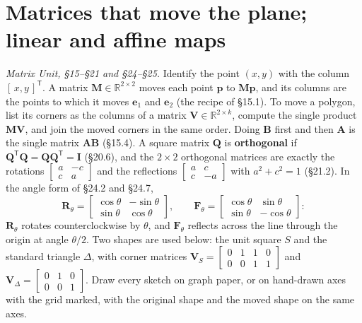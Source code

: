 \documentclass[11pt]{article}
\newcommand{\R}{\mathbb{R}}
\newcommand{\vc}[1]{\mathbf{#1}}
\newcommand{\mt}[1]{\mathbf{#1}}          %
\newcommand{\T}{^{\mathsf{T}}}            %
\begin{document}
\section{Matrices that move the plane; linear and affine maps}
\emph{Matrix Unit, \S15--\S21 and \S24--\S25.} Identify the point $(x,y)$ with
the column $[\,x,y\,]\T$. A matrix $\mt{M}\in\R^{2\times2}$ moves each point
$\vc{p}$ to $\mt{M}\vc{p}$, and its columns are the points to which it moves
$\vc{e}_1$ and $\vc{e}_2$ (the recipe of \S15.1). To move a polygon, list its
corners as the columns of a matrix $\mt{V}\in\R^{2\times k}$, compute the single
product $\mt{M}\mt{V}$, and join the moved corners in the same order. Doing
$\mt{B}$ first and then $\mt{A}$ is the single matrix $\mt{A}\mt{B}$ (\S15.4).
A square matrix $\mt{Q}$ is \textbf{orthogonal} if
$\mt{Q}\T\mt{Q}=\mt{Q}\mt{Q}\T=\mt{I}$ (\S20.6), and the $2\times2$ orthogonal
matrices are exactly the rotations $\left[\begin{smallmatrix}a&-c\\c&a\end{smallmatrix}\right]$
and the reflections $\left[\begin{smallmatrix}a&c\\c&-a\end{smallmatrix}\right]$
with $a^{2}+c^{2}=1$ (\S21.2). In the angle form of \S24.2 and \S24.7,
\[
  \mt{R}_\theta=\begin{bmatrix}\cos\theta&-\sin\theta\\\sin\theta&\cos\theta\end{bmatrix},
  \qquad
  \mt{F}_\theta=\begin{bmatrix}\cos\theta&\sin\theta\\\sin\theta&-\cos\theta\end{bmatrix}:
\]
$\mt{R}_\theta$ rotates counterclockwise by $\theta$, and $\mt{F}_\theta$
reflects across the line through the origin at angle $\theta/2$.
Two shapes are used below: the unit square $S$ and the standard triangle
$\Delta$, with corner matrices
$\mt{V}_S=\left[\begin{smallmatrix}0&1&1&0\\0&0&1&1\end{smallmatrix}\right]$ and
$\mt{V}_\Delta=\left[\begin{smallmatrix}0&1&0\\0&0&1\end{smallmatrix}\right]$.
Draw every sketch on graph paper, or on hand-drawn axes with the grid marked,
with the original shape and the moved shape on the same axes.
\end{document}
